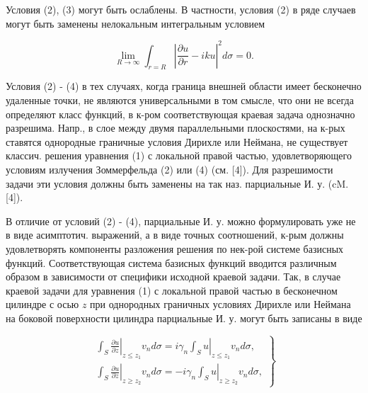 \documentclass[10pt]{article}
\begin{document}
Условия (2), (3) могут быть ослаблены. В частности, условия (2) в ряде случаев могут быть заменены нелокальным интегральным условием



\[

\lim _{R \rightarrow \infty} \int_{r=R}\left|\frac{\partial u}{\partial r}-i k u\right|^{2} d \sigma=0 .

\]



Условия (2) - (4) в тех случаях, когда граница внешней области имеет бесконечно удаленные точки, не являются универсальными в том смысле, что они не всегда определяют класс функций, в к-ром соответствующая краевая задача однозначно разрешима. Напр., в слое между двумя параллельными плоскостями, на к-рых ставятся однородные граничные условия Дирихле или Неймана, не существует классич. решения уравнения (1) с локальной правой частью, удовлетворяющего условиям излучения Зоммерфельда (2) или (4) (см. [4]). Для разрешимости задачи эти условия должны быть заменены на так наз. парциальные И. у. (cM. [4]).



В отличие от условий (2) - (4), парциальные И. у. можно формулировать уже не в виде асимптотич. выражений, а в виде точных соотношений, к-рым должны удовлетворять компоненты разложения решения по нек-рой системе базисных функций. Соответствующая система базисных функций вводится различным образом в зависимости от специфики исходной краевой задачи. Так, в случае краевой задачи для уравнения (1) с локальной правой частью в бесконечном цилиндре с осью $z$ при однородных граничных условиях Дирихле или Неймана на боковой поверхности цилиндра парциальные И. у. могут быть записаны в виде



\[

\left.\begin{array}{l}

\left.\int_{S} \frac{\partial u}{\partial z}\right|_{z \leqslant z_{1}} v_{n} d \sigma=\left.i \gamma_{n} \int_{S} u\right|_{z \leqslant z_{1}} v_{n} d \sigma, \\

\left.\int_{S} \frac{\partial u}{\partial z}\right|_{z \geqslant z_{2}} v_{n} d \sigma=-\left.i \gamma_{n} \int_{S} u\right|_{z \geqslant z_{2}} v_{n} d \sigma,

\end{array}\right\}

\]
\end{document}
